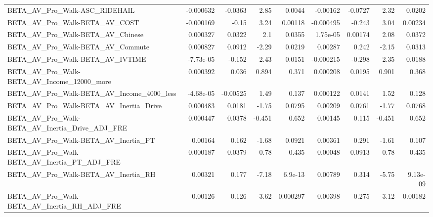 \begin{tabular}{lrrrrrrrr}
BETA\_AV\_Pro\_Walk-ASC\_RIDEHAIL                      &   -0.000632 &      -0.0363 &     2.85 &   0.0044 &   -0.00162 &     -0.0727 &         2.32 &        0.0202 \\
BETA\_AV\_Pro\_Walk-BETA\_AV\_COST                      &   -0.000169 &        -0.15 &     3.24 &  0.00118 &  -0.000495 &      -0.243 &         3.04 &       0.00234 \\
BETA\_AV\_Pro\_Walk-BETA\_AV\_Chinese                   &    0.000327 &       0.0322 &      2.1 &   0.0355 &   1.75e-05 &     0.00174 &         2.08 &        0.0372 \\
BETA\_AV\_Pro\_Walk-BETA\_AV\_Commute                   &    0.000827 &       0.0912 &    -2.29 &   0.0219 &    0.00287 &       0.242 &        -2.15 &        0.0313 \\
BETA\_AV\_Pro\_Walk-BETA\_AV\_IVTIME                    &   -7.73e-05 &       -0.152 &     2.43 &   0.0151 &  -0.000215 &      -0.298 &         2.35 &        0.0188 \\
BETA\_AV\_Pro\_Walk-BETA\_AV\_Income\_12000\_more         &    0.000392 &        0.036 &    0.894 &    0.371 &   0.000208 &      0.0195 &        0.901 &         0.368 \\
BETA\_AV\_Pro\_Walk-BETA\_AV\_Income\_4000\_less          &   -4.68e-05 &     -0.00525 &     1.49 &    0.137 &   0.000122 &      0.0141 &         1.52 &         0.128 \\
BETA\_AV\_Pro\_Walk-BETA\_AV\_Inertia\_Drive             &    0.000483 &       0.0181 &    -1.75 &   0.0795 &    0.00209 &      0.0761 &        -1.77 &        0.0768 \\
BETA\_AV\_Pro\_Walk-BETA\_AV\_Inertia\_Drive\_ADJ\_FRE     &    0.000447 &       0.0378 &   -0.451 &    0.652 &    0.00145 &       0.115 &       -0.451 &         0.652 \\
BETA\_AV\_Pro\_Walk-BETA\_AV\_Inertia\_PT                &     0.00164 &        0.162 &    -1.68 &   0.0921 &    0.00361 &       0.291 &        -1.61 &         0.107 \\
BETA\_AV\_Pro\_Walk-BETA\_AV\_Inertia\_PT\_ADJ\_FRE        &    0.000187 &       0.0379 &     0.78 &    0.435 &    0.00048 &      0.0913 &         0.78 &         0.435 \\
BETA\_AV\_Pro\_Walk-BETA\_AV\_Inertia\_RH                &     0.00321 &        0.177 &    -7.18 &  6.9e-13 &    0.00789 &       0.314 &        -5.75 &      9.13e-09 \\
BETA\_AV\_Pro\_Walk-BETA\_AV\_Inertia\_RH\_ADJ\_FRE        &     0.00126 &        0.126 &    -3.62 & 0.000297 &    0.00398 &       0.275 &        -3.12 &       0.00182 \\

\end{tabular}
